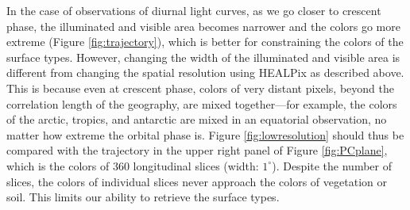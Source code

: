 \documentclass[iop,numberedappendix,apj,]{emulateapj}
\begin{document}
In the case of observations of diurnal light curves, as we go closer to crescent phase, the illuminated and visible area becomes narrower and the colors go more extreme (Figure \ref{fig:trajectory}), which is better for   constraining the colors of the surface types. 
However, changing the width of the illuminated and visible area is different from changing the spatial resolution using HEALPix as described above. 
This is because even at crescent phase, colors of very distant pixels, beyond the correlation length of the geography, are mixed together---for example, the colors of the arctic, tropics, and antarctic are mixed in an equatorial observation, no matter how extreme the orbital phase is. 
Figure \ref{fig:lowresolution} should thus be compared with the trajectory in the upper right panel of Figure \ref{fig:PCplane}, which is the colors of 360 longitudinal slices (width: $1^{\circ }$). 
Despite the number of slices, the colors of individual slices never approach the colors of vegetation or soil. 
This limits our ability to retrieve the surface types. 
\end{document}
